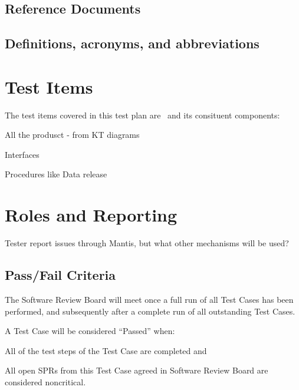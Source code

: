 \subsection{Reference Documents}

\renewcommand{\refname}{}



\subsection{Definitions, acronyms, and abbreviations \label{sect:acronyms}} 


\section{Test Items}

The test items covered in this test plan are \product \ and its consituent components:

\begin{itemize_single}
\item All the produsct - from KT diagrams

\item Interfaces  
\item Procedures like Data release 
\end{itemize_single}


\section{Roles and Reporting}

Tester report issues through Mantis, but what other mechanisms will be used?

\subsection{Pass/Fail Criteria}

The Software Review Board will meet once a full run of all Test Cases has been performed, and subsequently after a complete run of all outstanding Test Cases.

A Test Case will be considered ``Passed'' when:
\begin{itemize_single}
\item All of the test steps of the Test Case are completed and
\item All open SPRs from this Test Case agreed in Software Review Board are considered noncritical.
\end{itemize_single}

